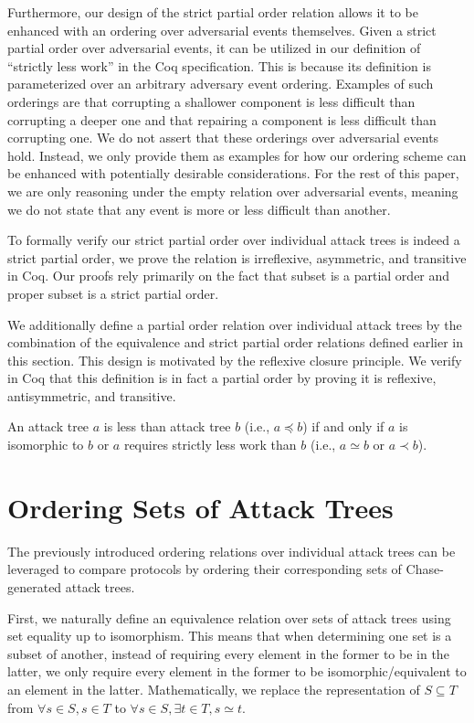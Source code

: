 \documentclass[runningheads]{llncs}
\theoremstyle{definition}
\begin{document}
Furthermore, our design of the strict partial order relation allows it to be enhanced with an ordering over adversarial events themselves. Given a strict partial order over adversarial events, it can be utilized in our definition of ``strictly less work'' in the Coq specification. This is because its definition is parameterized over an arbitrary adversary event ordering. Examples of such orderings are that corrupting a shallower component is less difficult than corrupting a deeper one and that repairing a component is less difficult than corrupting one. We do not assert that these orderings over adversarial events hold. Instead, we only provide them as examples for how our ordering scheme can be enhanced with potentially desirable considerations. For the rest of this paper, we are only reasoning under the empty relation over adversarial events, meaning we do not state that any event is more or less difficult than another.


To formally verify our strict partial order over individual attack trees is indeed a strict partial order, we prove the relation is irreflexive, asymmetric, and transitive in Coq. Our proofs rely primarily on the fact that subset is a partial order and proper subset is a strict partial order.

We additionally define a partial order relation over individual attack trees by the combination of the equivalence and strict partial order relations defined earlier in this section. This design is motivated by the reflexive closure principle. We verify in Coq that this definition is in fact a partial order by proving it is reflexive, antisymmetric, and transitive.

\begin{definition}
  An attack tree $a$ is less than attack tree $b$ (i.e., $a \preceq b$) if and only if $a$ is isomorphic to $b$ or $a$ requires strictly less work than $b$ (i.e., $a \simeq b$ or $a \prec b$).
\end{definition}


\section{Ordering Sets of Attack Trees}

The previously introduced ordering relations over individual attack trees can be leveraged to compare protocols by ordering their corresponding sets of Chase-generated attack trees. 

First, we naturally define an equivalence relation over sets of attack trees using set equality up to isomorphism. This means that when determining one set is a subset of another, instead of requiring every element in the former to be in the latter, we only require every element in the former to be isomorphic/equivalent to an element in the latter. Mathematically, we replace the representation of $S \subseteq T$ from $\forall s \in S, s \in T$ to $\forall s \in S, \exists t \in T, s \simeq t$.
\end{document}

